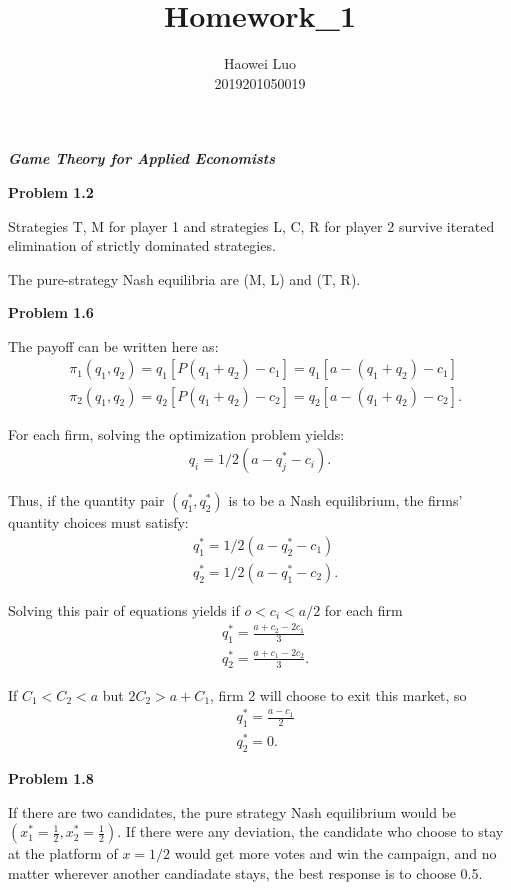 \documentclass{article}
\title{\textbf{Homework\_1}}
\author{Haowei Luo\\2019201050019}
\begin{document}
\maketitle
\noindent\Large{\textit{\textbf{{Game Theory for Applied Economists}}}

\noindent\Large{\textbf{{Problem 1.2}}

Strategies T, M for player 1 and strategies L, C, R for player 2 survive
iterated elimination of strictly dominated strategies.

The pure-strategy Nash equilibria are (M, L) and (T, R).

\noindent\Large{\textbf{{Problem 1.6}}

The payoff can be written here as:
\begin{align*}
    &\pi_1(q_1, q_2)=q_1[P(q_1+q_2)-c_1]=q_1[a-(q_1+q_2)-c_1] \\
    &\pi_2(q_1, q_2)=q_2[P(q_1+q_2)-c_2]=q_2[a-(q_1+q_2)-c_2].
\end{align*}

For each firm, solving the optimization problem yields:
\begin{align*}
    q_i=1/2(a-q_j^*-c_i).
\end{align*}

Thus, if the quantity pair $(q_1^*, q_2^*)$ is to be a Nash equilibrium, the
firms' quantity choices must satisfy:
\begin{align*}
    &q_1^*=1/2(a-q_2^*-c_1)\\
    &q_2^*=1/2(a-q_1^*-c_2).
\end{align*}

Solving this pair of equations yields if $o<c_i<a/2$ for each firm
\begin{align*}
    &q_1^*=\frac{a+c_2-2c_1}{3}\\
    &q_2^*=\frac{a+c_1-2c_2}{3}.
\end{align*}

If $C_1<C_2<a$ but $2C_2>a+C_1$, firm 2 will choose to exit this market, so
\begin{align*}
    &q_1^*=\frac{a-c_1}{2}\\
    &q_2^*=0.
\end{align*}

\noindent\Large{\textbf{{Problem 1.8}}

If there are two candidates, the pure strategy Nash equilibrium would be $(x_1^*=\frac{1}{2}, x_2^*=\frac{1}{2})$. If there were any deviation, the candidate who choose to stay at the platform of $x=1/2$ would get more votes and win the campaign, and no matter wherever another candiadate stays, the best response is to choose 0.5.

}}}}
\end{document}
